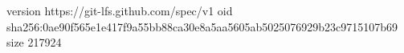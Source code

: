 version https://git-lfs.github.com/spec/v1
oid sha256:0ae90f565e1e417f9a55bb88ca30e8a5aa5605ab5025076929b23c9715107b69
size 217924
